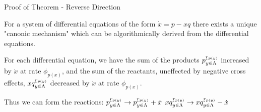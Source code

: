 \begin{frame}{Proof of Theorem - Reverse Direction}
    
	For a system of differential equations of the form \(\dot x = p - xq\) there exists a unique "canonic mechanism" which can be algorithmically derived from the differential equations.\newline
        
        For each differential equation, we have the sum of the products \(p_{y \in \Lambda}^{\underaccent{\tilde}{r}_{p(y)}}\) increased by \(\dot x\) at rate \(\phi_{p(x)}\), and the sum of the reactants, uneffected by negative cross effects, \(xq_{y \in \Lambda}^{\underaccent{\tilde}{r}_{p(y)}}\) decreased by \(\dot x\) at rate \(\phi_{p(x)}\).\newline
        
        Thus we can form the reactions:\newline \newline
        \(p_{y \in \Lambda}^{\underaccent{\tilde}{r}_{p(y)}} \to p_{y \in \Lambda}^{\underaccent{\tilde}{r}_{p(y)}} + \dot x\) \newline \newline
        \(xq_{y \in \Lambda}^{\underaccent{\tilde}{r}_{p(y)}} \to xq_{y \in \Lambda}^{\underaccent{\tilde}{r}_{p(y)}} - \dot x\)
    
\end{frame}
